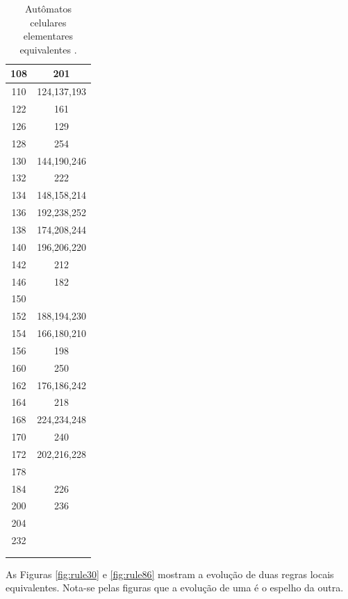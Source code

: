 \documentclass[12pt,a4paper]{article}
\begin{document}
\begin{table}[H]
\begin{minipage}[b]{0.3\linewidth}
\begin{tabular}{|c|c|}
108 & 201 \\ \hline
110 & 124,137,193 \\ \hline
122 & 161 \\ \hline
126 & 129 \\ \hline
128 & 254 \\ \hline
130 & 144,190,246 \\ \hline
132 & 222 \\ \hline
134 & 148,158,214 \\ \hline
136 & 192,238,252 \\ \hline
138 & 174,208,244 \\ \hline
140 & 196,206,220 \\ \hline
142 & 212 \\ \hline
146 & 182 \\ \hline
150 & \\ \hline
152 & 188,194,230 \\ \hline
154 & 166,180,210 \\ \hline
156 & 198 \\ \hline
160 & 250 \\ \hline
162 & 176,186,242 \\ \hline
164 & 218 \\ \hline
168 & 224,234,248 \\ \hline
170 & 240 \\ \hline
172 & 202,216,228 \\ \hline
178 & \\ \hline
184 & 226 \\ \hline
200 & 236 \\ \hline
204 & \\ \hline
232 & \\ \hline
& \\ \hline
& \\ \hline
\end{tabular}
\end{minipage}
\caption{Autômatos celulares elementares equivalentes .}
\label{tab:equiv}
\end{table}

As Figuras \ref{fig:rule30} e \ref{fig:rule86} mostram a evolução de duas regras locais
equivalentes. Nota-se pelas figuras que a evolução de uma é o espelho da outra.
\end{document}
